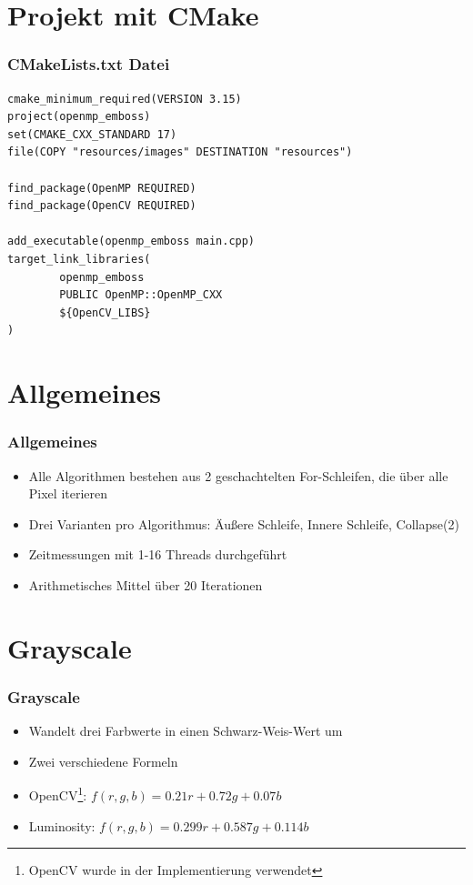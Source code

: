 \section{Projekt mit CMake}

\begin{frame}[fragile]
    \frametitle{CMakeLists.txt Datei}


    \begin{verbatim}
cmake_minimum_required(VERSION 3.15)
project(openmp_emboss)
set(CMAKE_CXX_STANDARD 17)
file(COPY "resources/images" DESTINATION "resources")

find_package(OpenMP REQUIRED)
find_package(OpenCV REQUIRED)

add_executable(openmp_emboss main.cpp)
target_link_libraries(
        openmp_emboss
        PUBLIC OpenMP::OpenMP_CXX
        ${OpenCV_LIBS}
)        
    \end{verbatim}
\end{frame}

\section {Allgemeines}

\begin{frame}
    \frametitle{Allgemeines}

    \begin{itemize}
        \item Alle Algorithmen bestehen aus 2 geschachtelten For-Schleifen, die über alle Pixel iterieren
        \item Drei Varianten pro Algorithmus: Äußere Schleife, Innere Schleife, Collapse(2)
        \item Zeitmessungen mit 1-16 Threads durchgeführt
        \item Arithmetisches Mittel über 20 Iterationen
    \end{itemize}
\end{frame}


\section{Grayscale}

\begin{frame}
    \frametitle{Grayscale}

    \begin{itemize}
        \item Wandelt drei Farbwerte in einen Schwarz-Weis-Wert um \pause
        \item Zwei verschiedene Formeln \pause
        \item OpenCV\footnote{OpenCV wurde in der Implementierung verwendet}: $ f(r, g, b) = 0.21r + 0.72g + 0.07b $  \pause
        \item Luminosity: $ f(r, g, b) =  0.299r + 0.587g + 0.114b $ \pause
    \end{itemize}
\end{frame}

